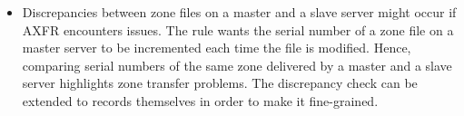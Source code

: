 \begin{itemize}
\item Discrepancies between zone files on a master and a slave server might occur if AXFR encounters issues. The rule wants the serial number of a zone file on a master server to be incremented each time the file is modified. Hence, comparing serial numbers of the same zone delivered by a master and a slave server highlights zone transfer problems. The discrepancy check can be extended to records themselves in order to make it fine-grained.      

\end{itemize}